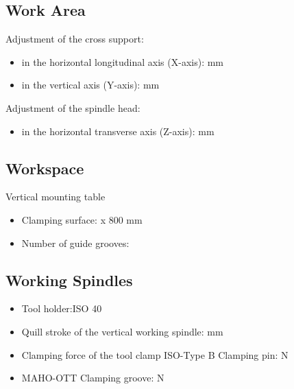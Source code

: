 

\subsection{Work Area}
Adjustment of the cross support:
\begin{itemize}
    \item in the horizontal longitudinal axis (X-axis):  mm
    \item in the vertical axis (Y-axis):  mm
\end{itemize}

Adjustment of the spindle head:
\begin{itemize}
    \item in the horizontal transverse axis (Z-axis):  mm
\end{itemize}

\subsection{Workspace}
Vertical mounting table \footnotemark[4]
\begin{itemize}
    \item Clamping surface:  x 800 mm
    \item Number of guide grooves: 
\end{itemize}


\subsection{Working Spindles}
\begin{itemize}
    \item Tool holder:\footnotemark[5] \dotfill ISO 40
    \item Quill stroke of the vertical working spindle:  mm
    \item Clamping force of the tool clamp ISO-Type B Clamping pin: \dotfill N \footnotemark[6]
    \item MAHO-OTT Clamping groove: \dotfill N \footnotemark[6]
\end{itemize}


